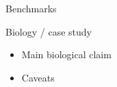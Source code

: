 
\begin{frame}{Benchmarks}
\end{frame}

\begin{frame}{Biology / case study}
  \begin{itemize}
    \item Main biological claim
    \item Caveats
  \end{itemize}
\end{frame}
